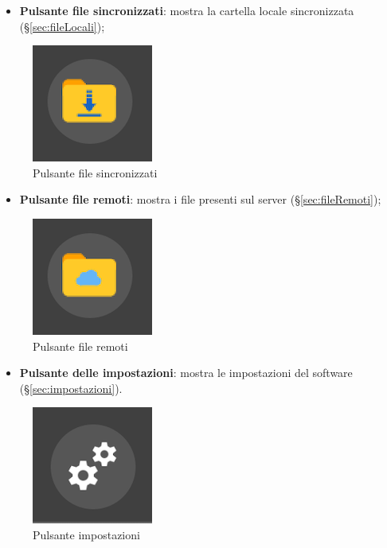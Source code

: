\begin{itemize}
\item \textbf{Pulsante file sincronizzati}: mostra la cartella locale sincronizzata (\S{}\ref{sec:fileLocali}); \
\end{itemize}
\begin{figure}[H]
    \centering
    \includegraphics[scale = 1]{components/img/pulsanteFileS.png}
    \caption{Pulsante file sincronizzati}
    \label{fig:PfileSync}
\end{figure}
\begin{itemize}
\item \textbf{Pulsante file remoti}: mostra i file presenti sul server (\S{}\ref{sec:fileRemoti}); \
\end{itemize}
\begin{figure}[H]
    \centering
    \includegraphics[scale = 1]{components/img/pulsanteFileR.png}
    \caption{Pulsante file remoti}
    \label{fig:PfileRem}
\end{figure}
\begin{itemize}
\item \textbf{Pulsante delle impostazioni}: mostra le impostazioni del software (\S{}\ref{sec:impostazioni}). \
\end{itemize}
\begin{figure}[H]
    \centering
    \includegraphics[scale = 1]{components/img/pulsanteImpostazioni.png}
    \caption{Pulsante impostazioni}
    \label{fig:PImp}
\end{figure}


